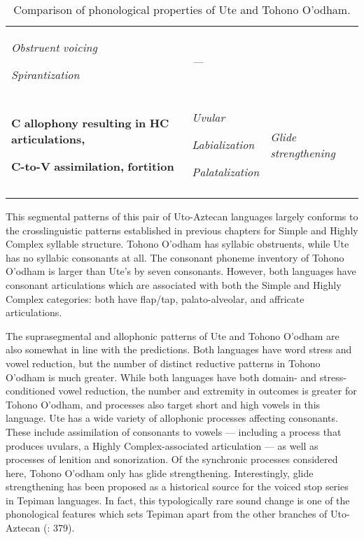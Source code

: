 \begin{table}
\begin{tabularx}{\textwidth}{XXX}
{ \textit{Obstruent} \textit{voicing}}

 \textit{Spirantization} & \textit{—}\\
{ \textbf{C} \textbf{allophony} \textbf{resulting} \textbf{in} \textbf{HC} \textbf{articulations,} }

 \textbf{C-to-V} \textbf{assimilation,} \textbf{fortition} & { \textit{Uvular}}

{ \textit{Labialization}}

 \textit{Palatalization} & \textit{Glide} \textit{strengthening}\\
\lspbottomrule
\end{tabularx}
\caption{\label{8.2}Comparison of phonological properties of Ute and Tohono O’odham.}
\end{table}




  This segmental patterns of this pair of Uto-Aztecan languages largely conforms to the crosslinguistic patterns established in previous chapters for Simple and Highly Complex syllable structure. Tohono O’odham has syllabic obstruents, while Ute has no syllabic consonants at all. The consonant phoneme inventory of Tohono O’odham is larger than Ute’s by seven consonants. However, both languages have consonant articulations which are associated with both the Simple and Highly Complex categories: both have flap/tap, palato-alveolar, and affricate articulations.



  The suprasegmental and allophonic patterns of Ute and Tohono O’odham are also somewhat in line with the predictions. Both languages have word stress and vowel reduction, but the number of distinct reductive patterns in Tohono O’odham is much greater. While both languages have both domain- and stress-conditioned vowel reduction, the number and extremity in outcomes is greater for Tohono O’odham, and processes also target short and high vowels in this language. Ute has a wide variety of allophonic processes affecting consonants. These include assimilation of consonants to vowels — including a process that produces uvulars, a Highly Complex-associated articulation — as well as processes of lenition and sonorization. Of the synchronic processes considered here, Tohono O’odham only has glide strengthening. Interestingly, glide strengthening has been proposed as a historical source for the voiced stop series in Tepiman languages. In fact, this typologically rare sound change is one of the phonological features which sets Tepiman apart from the other branches of Uto-Aztecan (\citealt{ShaulHill1998}: 379).



